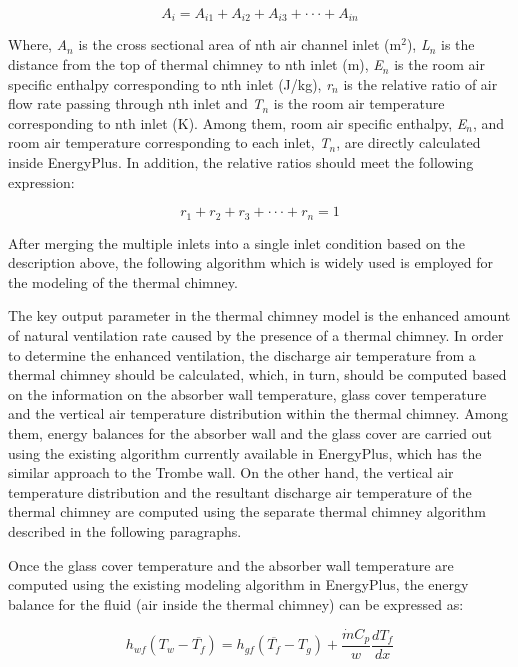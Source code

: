 \begin{equation}
{A_i} = {A_{i1}} + {A_{i2}} + {A_{i3}} +  \cdot  \cdot  \cdot  + {A_{in}}
\end{equation}

Where, \emph{A\(_{n}\)} is the cross sectional area of nth air channel inlet (m\(^{2}\)), \emph{L\(_{n}\)} is the distance from the top of thermal chimney to nth inlet (m), \emph{E\(_{n}\)} is the room air specific enthalpy corresponding to nth inlet (J/kg), \emph{r\(_{n}\)} is the relative ratio of air flow rate passing through nth inlet and \emph{T\(_{n}\)} is the room air temperature corresponding to nth inlet (K). Among them, room air specific enthalpy, \emph{E\(_{n}\)}, and room air temperature corresponding to each inlet, \emph{T\(_{n}\)}, are directly calculated inside EnergyPlus. In addition, the relative ratios should meet the following expression:

\begin{equation}
{r_1} + {r_2} + {r_3} +  \cdot  \cdot  \cdot  + {r_n} = 1
\end{equation}

After merging the multiple inlets into a single inlet condition based on the description above, the following algorithm which is widely used is employed for the modeling of the thermal chimney.

The key output parameter in the thermal chimney model is the enhanced amount of natural ventilation rate caused by the presence of a thermal chimney. In order to determine the enhanced ventilation, the discharge air temperature from a thermal chimney should be calculated, which, in turn, should be computed based on the information on the absorber wall temperature, glass cover temperature and the vertical air temperature distribution within the thermal chimney. Among them, energy balances for the absorber wall and the glass cover are carried out using the existing algorithm currently available in EnergyPlus, which has the similar approach to the Trombe wall. On the other hand, the vertical air temperature distribution and the resultant discharge air temperature of the thermal chimney are computed using the separate thermal chimney algorithm described in the following paragraphs.

Once the glass cover temperature and the absorber wall temperature are computed using the existing modeling algorithm in EnergyPlus, the energy balance for the fluid (air inside the thermal chimney) can be expressed as:

\begin{equation}
{h_{wf}}({T_w} - \overline {{T_f}} ) = {h_{gf}}(\overline {{T_f}}  - {T_g}) + \frac{{\dot m{C_p}}}{w}\frac{{d{T_f}}}{{dx}}
\end{equation}

